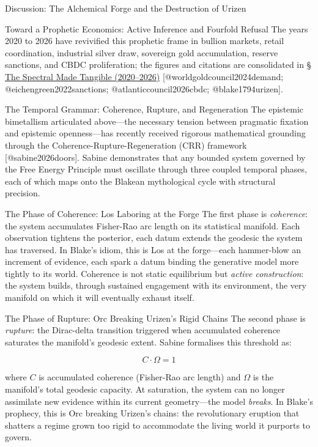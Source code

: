 \documentclass[
  ignorenonframetext,
]{beamer}
\begin{document}
\begin{frame}{Discussion: The Alchemical Forge and the Destruction of
Urizen}
\begin{block}{Toward a Prophetic Economics: Active Inference and
Fourfold Refusal}
The years 2020 to 2026 have revivified this prophetic frame in bullion
markets, retail coordination, industrial silver draw, sovereign gold
accumulation, reserve sanctions, and CBDC proliferation; the figures and
citations are consolidated in \hyperlink{sec-spectral-2020-2026}{§ The
Spectral Made Tangible (2020--2026)} {[}@worldgoldcouncil2024demand;
@eichengreen2022sanctions; @atlanticcouncil2026cbdc;
@blake1794urizen{]}.
\end{block}

\begin{block}{The Temporal Grammar: Coherence, Rupture, and
Regeneration}
\protect{}\label{the-temporal-grammar-coherence-rupture-and-regeneration}
The epistemic bimetallism articulated above---the necessary tension
between pragmatic fixation and epistemic openness---has recently
received rigorous mathematical grounding through the
Coherence-Rupture-Regeneration (CRR) framework {[}@sabine2026doors{]}.
Sabine demonstrates that any bounded system governed by the Free Energy
Principle must oscillate through three coupled temporal phases, each of
which maps onto the Blakean mythological cycle with structural
precision.

\begin{block}{The Phase of Coherence: Los Laboring at the Forge}
\protect{}\label{the-phase-of-coherence-los-laboring-at-the-forge}
The first phase is \emph{coherence}: the system accumulates Fisher-Rao
arc length on its statistical manifold. Each observation tightens the
posterior, each datum extends the geodesic the system has traversed. In
Blake's idiom, this is Los at the forge---each hammer-blow an increment
of evidence, each spark a datum binding the generative model more
tightly to its world. Coherence is not static equilibrium but
\emph{active construction}: the system builds, through sustained
engagement with its environment, the very manifold on which it will
eventually exhaust itself.
\end{block}

\begin{block}{The Phase of Rupture: Orc Breaking Urizen's Rigid Chains}
\protect{}\label{the-phase-of-rupture-orc-breaking-urizens-rigid-chains}
The second phase is \emph{rupture}: the Dirac-delta transition triggered
when accumulated coherence saturates the manifold's geodesic extent.
Sabine formalises this threshold as:

\[C \cdot \Omega = 1\]

where \(C\) is accumulated coherence (Fisher-Rao arc length) and
\(\Omega\) is the manifold's total geodesic capacity. At saturation, the
system can no longer assimilate new evidence within its current
geometry---the model \emph{breaks}. In Blake's prophecy, this is Orc
breaking Urizen's chains: the revolutionary eruption that shatters a
regime grown too rigid to accommodate the living world it purports to
govern.
\end{block}


\end{block}
\end{frame}
\end{document}
